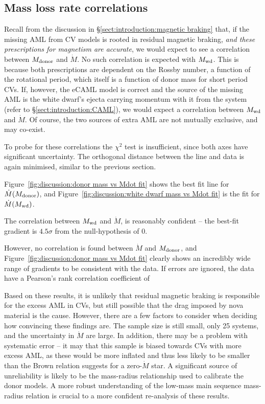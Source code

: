 \subsection{Mass loss rate correlations}

Recall from the discussion in \S\ref{sect:introduction:magnetic braking} that, if the missing AML from CV models is rooted in residual magnetic braking, {\it and these prescriptions for magnetism are accurate}, we would expect to see a correlation between $M_{\rm donor}$ and $\dot M$. No such correlation is expected with $M_{\rm wd}$.
This is because both prescriptions are dependent on the Rossby number, a function of the rotational period, which itself is a function of donor mass for short period CVs.
If, however, the eCAML model is correct and the source of the missing AML is the white dwarf's ejecta carrying momentum with it from the system (refer to \S\ref{sect:introduction:CAML}), we would expect a correlation between $M_{\rm wd}$ and $\dot M$.
Of course, the two sources of extra AML are not mutually exclusive, and may co-exist.

To probe for these correlations the $\chi^2$ test is insufficient, since both axes have significant uncertainty. The orthogonal distance between the line and data is again minimised, similar to the previous section.

Figure~\ref{fig:discussion:donor mass vs Mdot fit} shows the best fit line for $\dot M(M_{\rm donor})$, and Figure~\ref{fig:discussion:white dwarf mass vs Mdot fit} is the fit for $\dot M(M_{\rm wd})$.

The correlation between $M_{\rm wd}$ and $\dot M$, is reasonably confident -- the best-fit gradient is $4.5\sigma$ from the null-hypothesis of 0.

However, no correlation is found between $\dot M$ and $M_{\rm donor}$, and Figure~\ref{fig:discussion:donor mass vs Mdot fit} clearly shows an incredibly wide range of gradients to be consistent with the data. If errors are ignored, the data have a Pearson's rank correlation coefficient of

Based on these results, it is unlikely that residual magnetic braking is responsible for the excess AML in CVs, but still possible that the drag imposed by nova material is the cause.
However, there are a few factors to consider when deciding how convincing these findings are.
The sample size is still small, only 25 systems, and the uncertainty in $\dot M$ are large. In addition, there may be a problem with systematic error -- it may that this sample is biased towards CVs with more excess AML, as these would be more inflated and thus less likely to be smaller than the Brown relation suggests for a zero-$\dot M$ star.
A significant source of unreliability is likely to be the mass-radius relationship used to calibrate the donor models. A more robust understanding of the low-mass main sequence mass-radius relation is crucial to a more confident re-analysis of these results.

